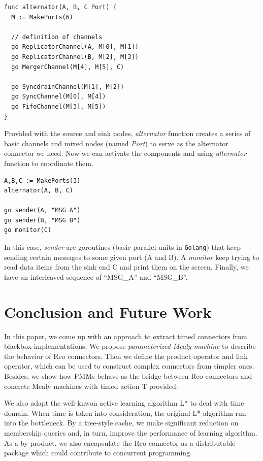 \documentclass[conference, a4paper]{IEEEtran}
\begin{document}
\begin{lstlisting}
func alternator(A, B, C Port) {
  M := MakePorts(6)

  // definition of channels
  go ReplicatorChannel(A, M[0], M[1])
  go ReplicatorChannel(B, M[2], M[3])
  go MergerChannel(M[4], M[5], C)

  go SyncdrainChannel(M[1], M[2])
  go SyncChannel(M[0], M[4])
  go FifoChannel(M[3], M[5])
}
\end{lstlisting}

Provided with the source and sink nodes, \emph{alternator} function creates a series of basic
channels and mixed nodes (named \emph{Port}) to serve as the alternator connector we need. Now we
can activate the components and using \emph{alternator} function to coordinate them.

\begin{lstlisting}
A,B,C := MakePorts(3)
alternator(A, B, C)

go sender(A, "MSG A")
go sender(B, "MSG B")
go monitor(C)
\end{lstlisting}

In this case, \emph{sender} are goroutines (basic parallel units in \texttt{Golang}) that keep
sending certain messages to some given port (A and B). A \emph{monitor} keep trying to read data
items from the sink end C and print them on the screen. Finally, we have an interleaved sequence of
``MSG\_A'' and ``MSG\_B''.
 
\section{Conclusion and Future Work}
In this paper, we come up with an approach to extract timed connectors from blackbox
implementations. We propose \emph{parameterized Mealy machine} to describe the behavior of Reo
connectors. Then we define the product operator and link operator, which can be used to
construct complex connectors from simpler ones.
Besides, we show how PMMs behave as the bridge between Reo connectors and concrete Mealy
machines with timed action T provided. 

We also adapt the well-knwon active learning algorithm L* to deal with time domain.
When time is taken into consideration, the original L* algorithm run into the bottleneck.
By a tree-style cache, we make significant reduction on membership queries and, in turn,
improve the performance of learning algorithm. As a by-product, we also encapsulate the Reo
connector as a distributable package which could contribute to concurrent programming.
\end{document}
